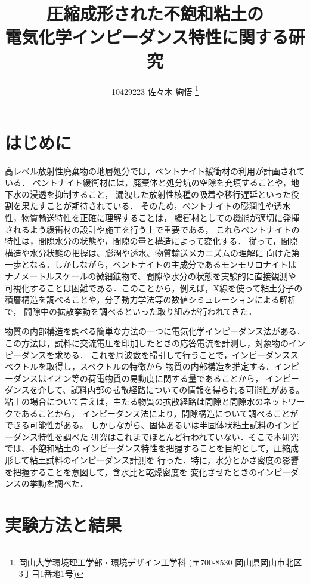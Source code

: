 \documentclass{jsce}
\title{
圧縮成形された不飽和粘土の\\
電気化学インピーダンス特性に関する研究
}%
\author{
10429223 佐々木 絢悟
\thanks{岡山大学環境理工学部・環境デザイン工学科 (〒700-8530 岡山県岡山市北区3丁目1番地1号)}
}
\begin{document}
\maketitle
\section{はじめに}
高レベル放射性廃棄物の地層処分では，ベントナイト緩衝材の利用が計画されている．
ベントナイト緩衝材には，廃棄体と処分坑の空隙を充填することや，地下水の浸透を抑制すること，
漏洩した放射性核種の吸着や移行遅延といった役割を果たすことが期待されている．
そのため，ベントナイトの膨潤性や透水性，物質輸送特性を正確に理解することは，
緩衝材としての機能が適切に発揮されるよう緩衝材の設計や施工を行う上で重要である，
これらベントナイトの特性は，間隙水分の状態や，間隙の量と構造によって変化する．
従って，間隙構造や水分状態の把握は、膨潤や透水、物質輸送メカニズムの理解に
向けた第一歩となる．しかしながら，ベントナイトの主成分であるモンモリロナイトは
ナノメートルスケールの微細鉱物で、間隙や水分の状態を実験的に直接観測や
可視化することは困難である．このことから，例えば，X線を使って粘土分子の
積層構造を調べることや，分子動力学法等の数値シミュレーションによる解析で，
間隙中の拡散挙動を調べるといった取り組みが行われてきた．

 物質の内部構造を調べる簡単な方法の一つに電気化学インピーダンス法がある．
この方法は，試料に交流電圧を印加したときの応答電流を計測し，対象物のインピーダンスを求める．
これを周波数を掃引して行うことで，インピーダンススペクトルを取得し，スペクトルの特徴から
物質の内部構造を推定する．インピーダンスはイオン等の荷電物質の易動度に関する量であることから，
インピーダンスを介して、試料内部の拡散経路についての情報を得られる可能性がある。
粘土の場合について言えば，主たる物質の拡散経路は間隙と間隙水のネットワークであることから，
インピーダンス法により，間隙構造について調べることができる可能性がある。
しかしながら、固体あるいは半固体状粘土試料のインピーダンス特性を調べた
研究はこれまでほとんど行われていない．そこで本研究では、不飽和粘土の
インピーダンス特性を把握することを目的として，圧縮成形して粘土試料のインピーダンス計測を
行った．特に，水分とかさ密度の影響を把握することを意図して，含水比と乾燥密度を
変化させたときのインピーダンスの挙動を調べた． 
\section{実験方法と結果}
\end{document}
